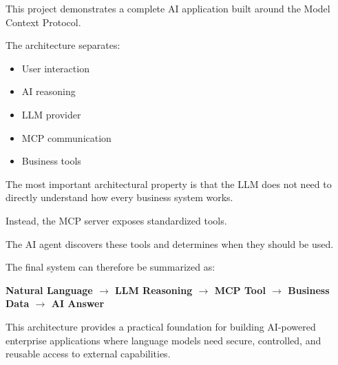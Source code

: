 \documentclass[11pt,a4paper]{article}
\begin{document}
This project demonstrates a complete AI application built around the
Model Context Protocol.

The architecture separates:

\begin{itemize}
\item User interaction
\item AI reasoning
\item LLM provider
\item MCP communication
\item Business tools
\end{itemize}

The most important architectural property is that the LLM does not need
to directly understand how every business system works.

Instead, the MCP server exposes standardized tools.

The AI agent discovers these tools and determines when they should be
used.

The final system can therefore be summarized as:

\begin{center}

\Large
\textbf{
Natural Language
$\rightarrow$
LLM Reasoning
$\rightarrow$
MCP Tool
$\rightarrow$
Business Data
$\rightarrow$
AI Answer
}

\end{center}

This architecture provides a practical foundation for building
AI-powered enterprise applications where language models need secure,
controlled, and reusable access to external capabilities.
\end{document}
